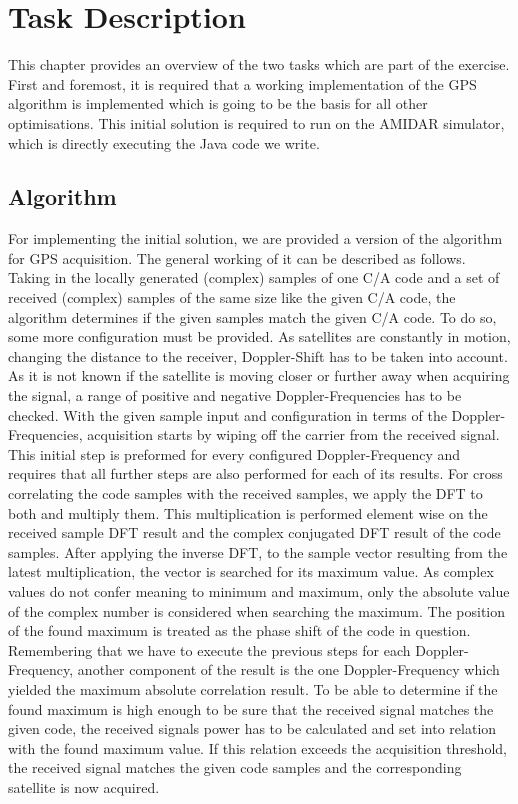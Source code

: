 \chapter{Task Description}
\label{cha:task}
	This chapter provides an overview of the two tasks which are part of the exercise.
	First and foremost, it is required that a working implementation of the GPS algorithm is implemented which is going to be the basis for all other optimisations. This initial solution is required to run on the AMIDAR simulator, which is directly executing the Java code we write.

	\section{Algorithm} %
	\label{sec:task_algorithm}
		For implementing the initial solution, we are provided a version of the algorithm for GPS acquisition. The general working of it can be described as follows.
		Taking in the locally generated (complex) samples of one C/A code and a set of received (complex) samples of the same size like the given C/A code, the algorithm determines if the given samples match the given C/A code. 
		To do so, some more configuration must be provided. As satellites are constantly in motion, changing the distance to the receiver, Doppler-Shift has to be taken into account. As it is not known if the satellite is moving closer or further away when acquiring the signal, a range of positive and negative Doppler-Frequencies has to be checked. With the given sample input and configuration in terms of the Doppler-Frequencies, acquisition starts by wiping off the carrier from the received signal. This initial step is preformed for every configured Doppler-Frequency and requires that all further steps are also performed for each of its results. 
		For cross correlating the code samples with the received samples, we apply the DFT to both and multiply them. This multiplication is performed element wise on the received sample DFT result and the complex conjugated DFT result of the code samples.
		After applying the inverse DFT, to the sample vector resulting from the latest multiplication, the vector is searched for its maximum value. As complex values do not confer meaning to minimum and maximum, only the absolute value of the complex number is considered when searching the maximum. The position of the found maximum is treated as the phase shift of the code in question. 
		Remembering that we have to execute the previous steps for each Doppler-Frequency, another component of the result is the one Doppler-Frequency which yielded the maximum absolute correlation result. 
		To be able to determine if the found maximum is high enough to be sure that the received signal matches the given code, the received signals power has to be calculated and set into relation with the found maximum value. If this relation exceeds the acquisition threshold, the received signal matches the given code samples and the corresponding satellite is now acquired.

